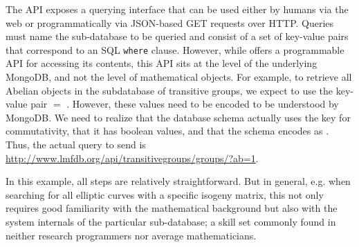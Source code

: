 The \lmfdb API \cite{lmfdbapi} exposes a querying interface that can be used either by humans via the web or programmatically via JSON-based GET requests over HTTP.
%
Queries must name the sub-database to be queried and consist of a set of key-value pairs that correspond to an SQL \texttt{where} clause.
However, while \lmfdb offers a programmable API for accessing its contents, this API sits at the level of the underlying MongoDB, and not the level of mathematical objects. 
For example, to retrieve all Abelian objects in the subdatabase of transitive groups, we expect to use the key-value pair $ = $ . 
However, these values need to be encoded to be understood by MongoDB.
We need to realize that the database schema actually uses the key  for commutativity, that it has boolean values, and that the schema encodes  as . 
Thus, the actual query to send is \url{http://www.lmfdb.org/api/transitivegroups/groups/?ab=1}. 

In this example, all steps are relatively straightforward. 
But in general, e.g. when searching for all elliptic curves with a specific isogeny matrix, this not only requires good familiarity with the mathematical background but also with the system internals of the particular \lmfdb sub-database; a skill set commonly found in neither research programmers nor average mathematicians.   


